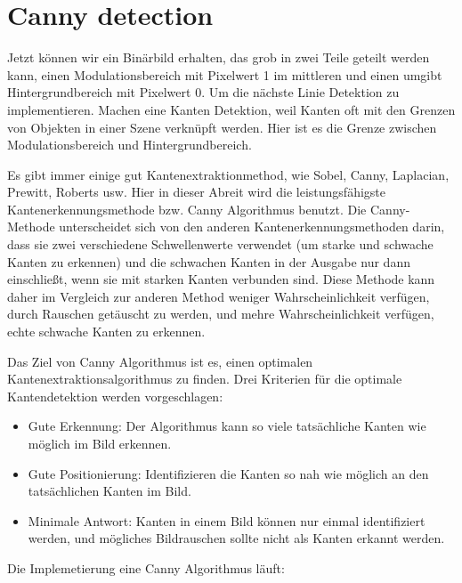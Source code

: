 \section{Canny detection}

Jetzt können wir ein Binärbild erhalten, das grob in zwei Teile geteilt werden kann, einen Modulationsbereich mit Pixelwert 1 im mittleren und einen umgibt Hintergrundbereich mit Pixelwert 0. Um die nächste Linie Detektion zu implementieren. Machen eine Kanten Detektion, weil Kanten oft mit den Grenzen von Objekten in einer Szene verknüpft werden. Hier ist es die Grenze zwischen Modulationsbereich und Hintergrundbereich. \cite{canny}

Es gibt immer einige gut Kantenextraktionmethod, wie Sobel, Canny, Laplacian, Prewitt, Roberts usw. Hier in dieser Abreit wird die leistungsfähigste Kantenerkennungsmethode bzw. Canny Algorithmus benutzt. Die Canny-Methode unterscheidet sich von den anderen Kantenerkennungsmethoden darin, dass sie zwei verschiedene Schwellenwerte verwendet (um starke und schwache Kanten zu erkennen) und die schwachen Kanten in der Ausgabe nur dann einschließt, wenn sie mit starken Kanten verbunden sind. Diese Methode kann daher im Vergleich zur anderen Method weniger Wahrscheinlichkeit verfügen, durch Rauschen getäuscht zu werden, und mehre Wahrscheinlichkeit verfügen, echte schwache Kanten zu erkennen.

Das Ziel von Canny Algorithmus ist es, einen optimalen Kantenextraktionsalgorithmus zu finden. Drei Kriterien für die optimale Kantendetektion werden vorgeschlagen:

\begin{itemize}

\item Gute Erkennung: Der Algorithmus kann so viele tatsächliche Kanten wie möglich im Bild erkennen.
\item Gute Positionierung: Identifizieren die Kanten so nah wie möglich an den tatsächlichen Kanten im Bild.
\item Minimale Antwort: Kanten in einem Bild können nur einmal identifiziert werden, und mögliches Bildrauschen sollte nicht als Kanten erkannt werden.

\end{itemize}

Die Implemetierung eine Canny Algorithmus läuft:

